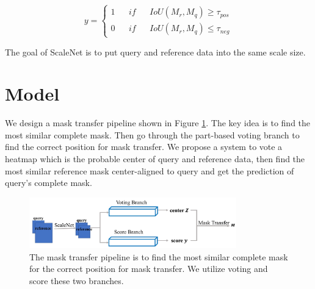 \documentclass[10pt,twocolumn,letterpaper]{article}
\begin{document}
      $$ y=\left\{
      \begin{aligned}
      1  && if && IoU(M_r, M_q) \geq \tau_{pos} \\
      0  && if && IoU(M_r, M_q) \leq \tau_{neg}
      \end{aligned}
      \right.
      $$
      
      
The goal of ScaleNet is to put query and reference data into the same scale size.


\section{Model}
We design a mask transfer pipeline shown in Figure \ref{fig:pipeline}. The key idea is to find the most similar complete mask. Then go through the part-based voting branch to find the correct position for mask transfer.  We propose a system to vote a heatmap which is the probable center of query and reference data, then find the most similar reference mask center-aligned to query and get the prediction of query's complete mask.  

	\begin{figure}[h]
	\begin{center}
		\includegraphics[width=0.8\textwidth]{pipeline.png}
		\caption{The mask transfer pipeline is to find the most similar complete mask for the correct position for mask transfer. We utilize voting and score these two branches. }
		\label{fig:pipeline}
	\end{center}
\end{figure}
\end{document}
